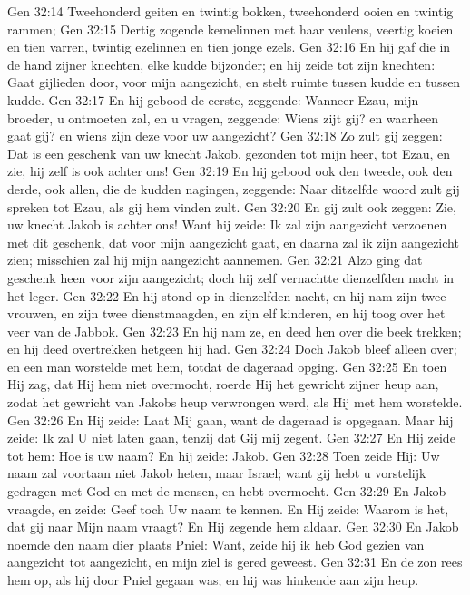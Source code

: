 Gen 32:14  Tweehonderd geiten en twintig bokken, tweehonderd ooien en twintig rammen;
Gen 32:15  Dertig zogende kemelinnen met haar veulens, veertig koeien en tien varren, twintig ezelinnen en tien jonge ezels.
Gen 32:16  En hij gaf die in de hand zijner knechten, elke kudde bijzonder; en hij zeide tot zijn knechten: Gaat gijlieden door, voor mijn aangezicht, en stelt ruimte tussen kudde en tussen kudde.
Gen 32:17  En hij gebood de eerste, zeggende: Wanneer Ezau, mijn broeder, u ontmoeten zal, en u vragen, zeggende: Wiens zijt gij? en waarheen gaat gij? en wiens zijn deze voor uw aangezicht?
Gen 32:18  Zo zult gij zeggen: Dat is een geschenk van uw knecht Jakob, gezonden tot mijn heer, tot Ezau, en zie, hij zelf is ook achter ons!
Gen 32:19  En hij gebood ook den tweede, ook den derde, ook allen, die de kudden nagingen, zeggende: Naar ditzelfde woord zult gij spreken tot Ezau, als gij hem vinden zult.
Gen 32:20  En gij zult ook zeggen: Zie, uw knecht Jakob is achter ons! Want hij zeide: Ik zal zijn aangezicht verzoenen met dit geschenk, dat voor mijn aangezicht gaat, en daarna zal ik zijn aangezicht zien; misschien zal hij mijn aangezicht aannemen.
Gen 32:21  Alzo ging dat geschenk heen voor zijn aangezicht; doch hij zelf vernachtte dienzelfden nacht in het leger.
Gen 32:22  En hij stond op in dienzelfden nacht, en hij nam zijn twee vrouwen, en zijn twee dienstmaagden, en zijn elf kinderen, en hij toog over het veer van de Jabbok.
Gen 32:23  En hij nam ze, en deed hen over die beek trekken; en hij deed overtrekken hetgeen hij had.
Gen 32:24  Doch Jakob bleef alleen over; en een man worstelde met hem, totdat de dageraad opging.
Gen 32:25  En toen Hij zag, dat Hij hem niet overmocht, roerde Hij het gewricht zijner heup aan, zodat het gewricht van Jakobs heup verwrongen werd, als Hij met hem worstelde.
Gen 32:26  En Hij zeide: Laat Mij gaan, want de dageraad is opgegaan. Maar hij zeide: Ik zal U niet laten gaan, tenzij dat Gij mij zegent.
Gen 32:27  En Hij zeide tot hem: Hoe is uw naam? En hij zeide: Jakob.
Gen 32:28  Toen zeide Hij: Uw naam zal voortaan niet Jakob heten, maar Israel; want gij hebt u vorstelijk gedragen met God en met de mensen, en hebt overmocht.
Gen 32:29  En Jakob vraagde, en zeide: Geef toch Uw naam te kennen. En Hij zeide: Waarom is het, dat gij naar Mijn naam vraagt? En Hij zegende hem aldaar.
Gen 32:30  En Jakob noemde den naam dier plaats Pniel: Want, zeide hij ik heb God gezien van aangezicht tot aangezicht, en mijn ziel is gered geweest.
Gen 32:31  En de zon rees hem op, als hij door Pniel gegaan was; en hij was hinkende aan zijn heup.

